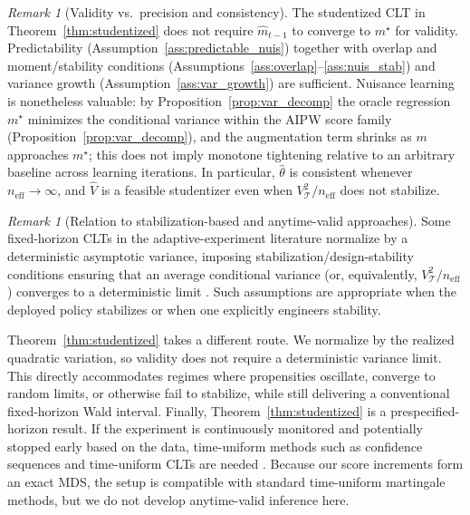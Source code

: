 \documentclass[11pt]{article}
\numberwithin{equation}{section}
\theoremstyle{plain}
\theoremstyle{definition}
\theoremstyle{remark}
\newtheorem{remark}[theorem]{Remark}
\begin{document}
\begin{remark}[Validity vs.\ precision and consistency]\label{rem:no_rates}
The studentized CLT in Theorem~\ref{thm:studentized} does not require
$\widehat m_{t-1}$ to converge to $m^\star$ for validity. Predictability
(Assumption~\ref{ass:predictable_nuis}) together with overlap and moment/stability conditions (Assumptions~\ref{ass:overlap}--\ref{ass:nuis_stab}) and variance growth (Assumption~\ref{ass:var_growth}) are
sufficient. Nuisance learning is nonetheless valuable: by
Proposition~\ref{prop:var_decomp} the oracle regression $m^\star$ minimizes the conditional variance within the AIPW score family (Proposition~\ref{prop:var_decomp}), and the augmentation term shrinks as $m$ approaches $m^\star$; this does not imply monotone tightening relative to an arbitrary baseline across learning iterations. In particular, $\widehat\theta$
is consistent whenever $n_{\mathrm{eff}}\to\infty$, and $\widehat V$ is a feasible
studentizer even when $V_{\mathcal{T}}^2/n_{\mathrm{eff}}$ does not stabilize.
\end{remark}

\begin{remark}[Relation to stabilization-based and anytime-valid approaches]\label{rem:stabilization}\label{rem:optional_stopping}
Some fixed-horizon CLTs in the adaptive-experiment literature normalize by a deterministic asymptotic variance, imposing stabilization/design-stability conditions ensuring that an average conditional variance (or, equivalently, $V_{\mathcal{T}}^2/n_{\mathrm{eff}}$) converges to a deterministic limit \citep{hadad2021confidence,zhan2021off,katoYasuiMcAlinn2021,cook2024semiparametric,sengupta2025designstability,zenati2025kernel}. Such assumptions are appropriate when the deployed policy stabilizes or when one explicitly engineers stability.

Theorem~\ref{thm:studentized} takes a different route. We normalize by the realized quadratic variation, so validity does not require a deterministic variance limit. This directly accommodates regimes where propensities oscillate, converge to random limits, or otherwise fail to stabilize, while still delivering a conventional fixed-horizon Wald interval. Finally, Theorem~\ref{thm:studentized} is a prespecified-horizon result. If the experiment is continuously monitored and potentially stopped early based on the data, time-uniform methods such as confidence sequences and time-uniform CLTs are needed \citep{howard2021confidence,waudbySmithRamdas2024betting,waudby2024timeuniform}. Because our score increments form an exact MDS, the setup is compatible with standard time-uniform martingale methods, but we do not develop anytime-valid inference here.
\end{remark}
\end{document}
